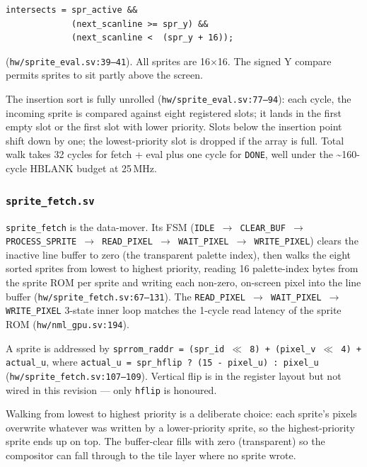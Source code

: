 \documentclass[11pt,letterpaper]{article}
\begin{document}
\begin{lstlisting}[style=sv]
intersects = spr_active &&
             (next_scanline >= spr_y) &&
             (next_scanline <  (spr_y + 16));
\end{lstlisting}

(\texttt{hw/sprite\_eval.sv:39--41}). All sprites are 16$\times$16. The
signed Y compare permits sprites to sit partly above the screen.

The insertion sort is fully unrolled (\texttt{hw/sprite\_eval.sv:77--94}):
each cycle, the incoming sprite is compared against eight registered slots; it
lands in the first empty slot or the first slot with lower priority. Slots
below the insertion point shift down by one; the lowest-priority slot is
dropped if the array is full. Total walk takes 32 cycles for fetch + eval plus
one cycle for \texttt{DONE}, well under the \textasciitilde 160-cycle HBLANK budget at
25\,MHz.

\subsubsection{\texttt{sprite\_fetch.sv}}

\texttt{sprite\_fetch} is the data-mover. Its FSM (\texttt{IDLE $\to$
CLEAR\_BUF $\to$ PROCESS\_SPRITE $\to$ READ\_PIXEL $\to$ WAIT\_PIXEL $\to$
WRITE\_PIXEL}) clears the inactive line buffer to zero (the transparent
palette index), then walks the eight sorted sprites from lowest to highest
priority, reading 16 palette-index bytes from the sprite ROM per sprite and
writing each non-zero, on-screen pixel into the line buffer
(\texttt{hw/sprite\_fetch.sv:67--131}). The \texttt{READ\_PIXEL $\to$
WAIT\_PIXEL $\to$ WRITE\_PIXEL} 3-state inner loop matches the 1-cycle read
latency of the sprite ROM (\texttt{hw/nml\_gpu.sv:194}).

A sprite is addressed by \texttt{sprrom\_raddr = (spr\_id $\ll$ 8) +
(pixel\_v $\ll$ 4) + actual\_u}, where
\texttt{actual\_u = spr\_hflip ? (15 - pixel\_u) : pixel\_u}
(\texttt{hw/sprite\_fetch.sv:107--109}). Vertical flip is in the register
layout but not wired in this revision --- only \texttt{hflip} is honoured.

Walking from lowest to highest priority is a deliberate choice: each sprite's
pixels overwrite whatever was written by a lower-priority sprite, so the
highest-priority sprite ends up on top. The buffer-clear fills with zero
(transparent) so the compositor can fall through to the tile layer where no
sprite wrote.
\end{document}
